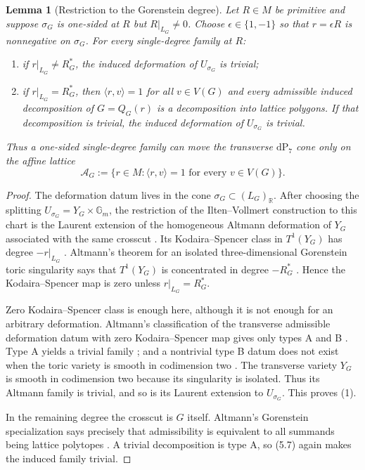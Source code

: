 \documentclass[11pt]{amsart}
\newtheorem{lemma}[theorem]{Lemma}
\theoremstyle{definition}
\theoremstyle{remark}
\theoremstyle{plain}
\newcommand{\RR}{\mathbb{R}}
\newcommand{\cA}{\mathcal{A}}
\newcommand{\dP}{\mathrm{dP}}
\begin{document}
\begin{lemma}[Restriction to the Gorenstein degree]\label{lem:degreegate}
Let $R\in M$ be primitive and suppose $\sigma_G$ is one-sided at $R$ but
$R|_{L_G}\ne0$.  Choose $\epsilon\in\{1,-1\}$ so that
$r=\epsilon R$ is nonnegative on $\sigma_G$.  For every single-degree family
at $R$:
\begin{enumerate}
\item if $r|_{L_G}\ne R_G^*$, the induced deformation of
  $U_{\sigma_G}$ is trivial;
\item if $r|_{L_G}=R_G^*$, then
  $\langle r,v\rangle=1$ for all $v\in V(G)$ and every admissible induced
  decomposition of $G=Q_G(r)$ is a decomposition into lattice polygons.
  If that decomposition is trivial, the induced deformation of
  $U_{\sigma_G}$ is trivial.
\end{enumerate}
Thus a one-sided single-degree family can move the transverse $\dP_7$ cone only
on the affine lattice
\[
 \cA_G:=\{r\in M:\langle r,v\rangle=1\text{ for every }v\in V(G)\}.
\]
\end{lemma}

\begin{proof}
The deformation datum lives in the cone
$\sigma_G\subset (L_G)_\RR$.  After choosing the splitting
$U_{\sigma_G}=Y_G\times\mathbb G_m$, the restriction of the
Ilten--Vollmert construction to this chart is the Laurent extension of the
homogeneous Altmann deformation of $Y_G$ associated with the same crosscut
\cite[\S3]{IV12}.  Its Kodaira--Spencer class in $T^1(Y_G)$ has degree
$-r|_{L_G}$ \cite[(5.3)]{Altmann95}.  Altmann's theorem for an isolated
three-dimensional Gorenstein toric singularity says that $T^1(Y_G)$ is
concentrated in degree $-R_G^*$ \cite[Thm.~(6.5)]{Altmann95}.  Hence the
Kodaira--Spencer map is zero unless $r|_{L_G}=R_G^*$.

Zero Kodaira--Spencer class is enough here, although it is not enough for an
arbitrary deformation.  Altmann's classification of the transverse admissible
deformation datum with zero Kodaira--Spencer map gives only types A and B
\cite[Prop.~(5.6)]{Altmann95}.  Type A yields a trivial family
\cite[(5.7)]{Altmann95}; and a nontrivial type B datum does not exist when the
toric variety is smooth in codimension two \cite[(5.8)]{Altmann95}.
The transverse variety $Y_G$ is smooth in codimension two because its
singularity is isolated.  Thus its Altmann family is trivial, and so is its
Laurent extension to $U_{\sigma_G}$.  This proves (1).

In the remaining degree the crosscut is $G$ itself.  Altmann's Gorenstein
specialization says precisely that admissibility is equivalent to all
summands being lattice polytopes \cite[Thm.~(6.6)]{Altmann95}.  A trivial
decomposition is type A, so (5.7) again makes the induced family trivial.
\end{proof}
\end{document}
